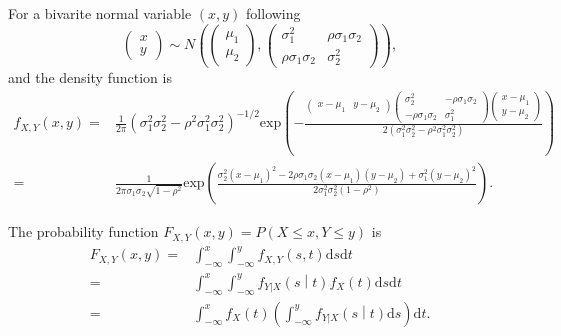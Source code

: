\documentclass[a4paper,12pt]{article}
\begin{document}
For a bivarite normal variable $\left(x, y\right)$ following
\[
  \begin{pmatrix}
    x    \\
    y
  \end{pmatrix}
  \sim N\left(
    \begin{pmatrix}
      \mu_1    \\
      \mu_2
    \end{pmatrix},
    \begin{pmatrix}
      \sigma_1^2 & \rho\sigma_1\sigma_2    \\
      \rho\sigma_1\sigma_2 & \sigma_2^2
    \end{pmatrix}
  \right)
  ,
\]
and the density function is
\[
  \begin{aligned}
    f_{X, Y}\left(x, y\right) =&
    \frac{1}{2\pi}
    \left(\sigma_1^2\sigma_2^2 - \rho^2\sigma_1^2\sigma_2^2\right)^{-1 / 2}
    \mathrm{exp}\left(
      - \frac{
        \begin{pmatrix}
          x - \mu_1 & y - \mu_2
        \end{pmatrix}
        \begin{pmatrix}
          \sigma_2^2 & -\rho\sigma_1\sigma_2    \\
          -\rho\sigma_1\sigma_2 & \sigma_1^2
        \end{pmatrix}
        \begin{pmatrix}
          x - \mu_1    \\
          y - \mu_2
        \end{pmatrix}
      }{
        2\left(
          \sigma_1^2\sigma_2^2 - \rho^2\sigma_1^2\sigma_2^2
        \right)}    
    \right)    \\
    =& \frac{1}{
      2\pi\sigma_1\sigma_2\sqrt{1 - \rho^2}}
     \mathrm{exp}\left(
        \frac{
          \sigma_2^2\left(x - \mu_1\right)^2
          -2\rho\sigma_1\sigma_2\left(x - \mu_1\right)\left(y - \mu_2\right)
          + \sigma_1^2\left(y - \mu_2\right)^2
        }{
          2\sigma_1^2\sigma_2^2\left(1 - \rho^2\right)
        }
      \right)
      .
  \end{aligned}
\]

The probability function $F_{X, Y}\left(x, y\right) = P\left(X \leq x, Y \leq y\right)$ is
\[
  \begin{aligned}
    F_{X, Y}\left(x, y\right)
    =& \int_{-\infty}^x\int_{-\infty}^y f_{X, Y}\left(s, t\right)\mathrm{d}s\mathrm{d}t    \\
    =& \int_{-\infty}^x\int_{-\infty}^y f_{Y|X}\left(s\middle|t\right)f_{X}\left(t\right)\mathrm{d}s\mathrm{d}t    \\
    =& \int_{-\infty}^x f_X\left(t\right)
    \left(
      \int_{-\infty}^y f_{Y|X}\left(s\middle|t\right) \mathrm{d}s
    \right)
    \mathrm{d}t
    .
  \end{aligned}
\]
\end{document}
